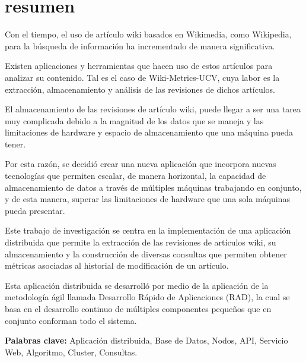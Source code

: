 \section*{resumen}

Con el tiempo, el uso de artículo wiki basados en Wikimedia,
como Wikipedia, para la búsqueda de información ha incrementado de
manera significativa.

Existen aplicaciones y herramientas que hacen uso de estos artículos
para analizar su contenido.
Tal es el caso de Wiki-Metrics-UCV, cuya labor es la extracción,
almacenamiento y análisis de las revisiones de dichos artículos.

El almacenamiento de las revisiones de artículo wiki,
puede llegar a ser una tarea muy complicada debido a la magnitud de los datos que se maneja y las limitaciones de hardware y espacio de almacenamiento que una máquina pueda tener.

Por esta razón, se decidió crear una nueva aplicación que incorpora
nuevas tecnologías que permiten escalar, de manera horizontal, la capacidad
de almacenamiento de datos a través de múltiples máquinas trabajando en conjunto, y de esta manera,
superar las limitaciones de hardware que una sola máquinas pueda presentar.

Este trabajo de investigación se centra en la implementación de una aplicación distribuida
que permite la extracción de las revisiones de artículos wiki, su almacenamiento y la
construcción de diversas consultas que permiten obtener métricas asociadas al historial
de modificación de un artículo.

Esta aplicación distribuida se desarrolló por medio de la aplicación de la metodología
ágil llamada Desarrollo Rápido de Aplicaciones (RAD), la cual se basa en el desarrollo
continuo de múltiples componentes pequeños que en conjunto conforman todo el sistema.

\textbf{Palabras clave:} Aplicación distribuida, Base de Datos, Nodos, API, Servicio Web, Algoritmo, Cluster, Consultas.
